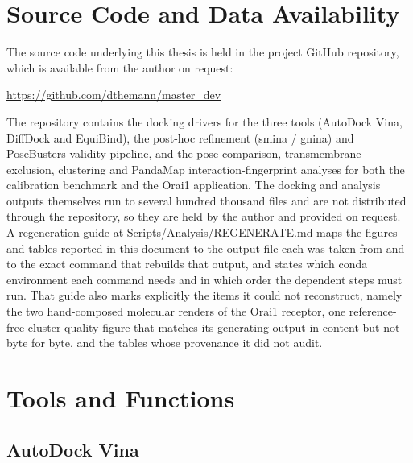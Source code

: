 \appendix

\hypertarget{source-code-and-data-availability}{%
\chapter{Source Code and Data Availability}\label{source-code-and-data-availability}}

The source code underlying this thesis is held in the project GitHub repository, which is available from the author on request:

\begin{center}
\url{https://github.com/dthemann/master_dev}
\end{center}

\noindent The repository contains the docking drivers for the three tools (AutoDock Vina, DiffDock and EquiBind), the post-hoc refinement (smina / gnina) and PoseBusters validity pipeline, and the pose-comparison, transmembrane-exclusion, clustering and PandaMap interaction-fingerprint analyses for both the calibration benchmark and the Orai1 application. The docking and analysis outputs themselves run to several hundred thousand files and are not distributed through the repository, so they are held by the author and provided on request. A regeneration guide at Scripts/Analysis/REGENERATE.md maps the figures and tables reported in this document to the output file each was taken from and to the exact command that rebuilds that output, and states which conda environment each command needs and in which order the dependent steps must run. That guide also marks explicitly the items it could not reconstruct, namely the two hand-composed molecular renders of the Orai1 receptor, one reference-free cluster-quality figure that matches its generating output in content but not byte for byte, and the tables whose provenance it did not audit.

\clearpage
\hypertarget{tools-and-functions}{%
\chapter{Tools and Functions}\label{tools-and-functions}}

\hypertarget{autodock-vina-1}{%
\section{AutoDock Vina}\label{autodock-vina-1}}

